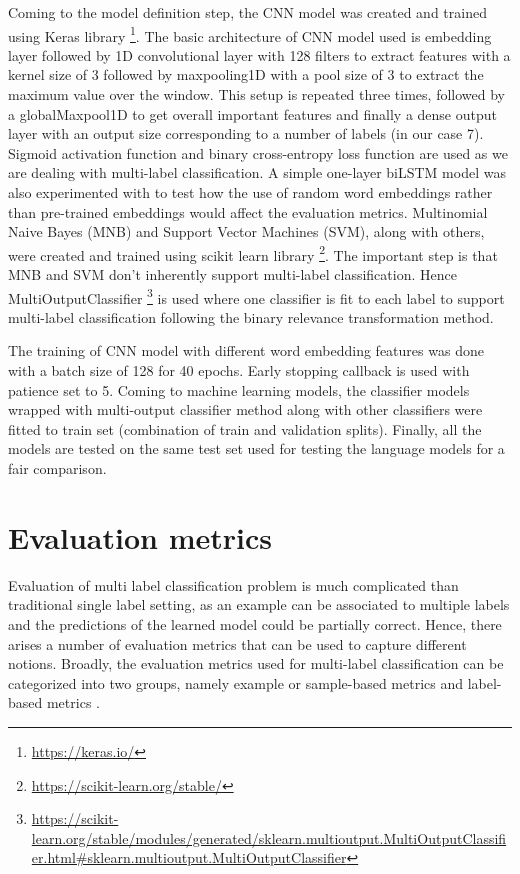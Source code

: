 Coming to the model definition step, the CNN model was created and trained using Keras library \footnote{\url{https://keras.io/}}. The basic architecture of CNN model used is embedding layer followed by 1D convolutional layer with 128 filters to extract features with a kernel size of 3 followed by maxpooling1D with a pool size of 3 to extract the maximum value over the window. This setup is repeated three times, followed by a globalMaxpool1D to get overall important features and finally a dense output layer with an output size corresponding to a number of labels (in our case 7). Sigmoid activation function and binary cross-entropy loss function are used as we are dealing with multi-label classification. A simple one-layer biLSTM model was also experimented with to test how the use of random word embeddings rather than pre-trained embeddings would affect the evaluation metrics. Multinomial Naive Bayes (MNB) and Support Vector Machines (SVM), along with others, were created and trained using scikit learn library \footnote{\url{https://scikit-learn.org/stable/}}. The important step is that MNB and SVM don't inherently support multi-label classification. Hence MultiOutputClassifier \footnote{\url{https://scikit-learn.org/stable/modules/generated/sklearn.multioutput.MultiOutputClassifier.html#sklearn.multioutput.MultiOutputClassifier}} is used where one classifier is fit to each label to support multi-label classification following the binary relevance transformation method.

The training of CNN model with different word embedding features was done with a batch size of 128 for 40 epochs. Early stopping callback is used with patience set to 5.
 Coming to machine learning models, the classifier models wrapped with multi-output classifier method along with other classifiers were fitted to train set (combination of train and validation splits). Finally, all the models are tested on the same test set used for testing the language models for a fair comparison.

\section{Evaluation metrics} \label{Evaluation_metrics}
Evaluation of multi label classification problem is much complicated than traditional single label setting, as an example can be associated to multiple labels and the predictions of the learned model could be partially correct\cite{sorower2010literature}\cite{zhang2013review}. Hence, there arises a number of evaluation metrics that can be used to capture different notions. 
Broadly, the evaluation metrics used for multi-label classification can be categorized into two groups, namely example or sample-based metrics and label-based metrics \cite{zhang2013review}.
\\


